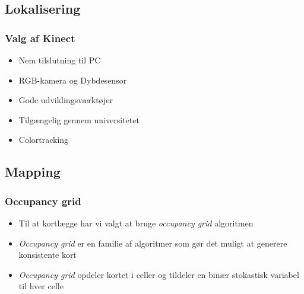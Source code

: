 \subsection{Lokalisering}
\begin{frame}
\frametitle{Valg af Kinect}
\begin{itemize}
\item Nem tilslutning til PC
\item RGB-kamera og Dybdesensor
\item Gode udviklingsværktøjer
\item Tilgængelig gennem universitetet
\item Colortracking
\end{itemize}
\end{frame}
\subsection{Mapping}
\begin{frame}
\frametitle{Occupancy grid}
\begin{itemize}
\item Til at kortlægge har vi valgt at bruge \textit{occupancy grid} algoritmen
\item \textit{Occupancy grid} er en familie af algoritmer som gør det muligt at generere konsistente kort
\item \textit{Occupancy grid} opdeler kortet i celler og tildeler en binær stokastisk variabel til hver celle
\end{itemize}
\end{frame}